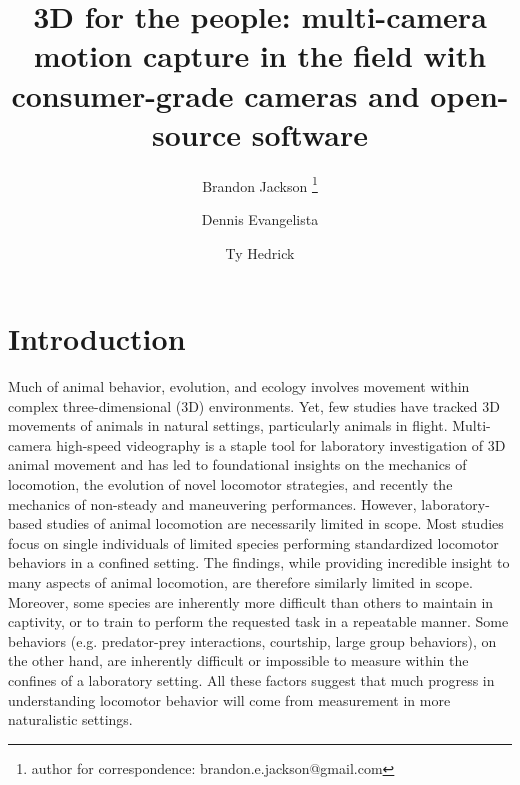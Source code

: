 \documentclass[fleqn,10pt]{wlpeerj}
\title{3D for the people: multi-camera motion capture in the field with consumer-grade cameras and open-source software}
\author[1,2]{Brandon Jackson \thanks{author for correspondence: brandon.e.jackson@gmail.com}}
\author[2]{Dennis Evangelista}
\author[2]{Ty Hedrick}
\affil[1]{Longwood College, Charlottesville, VA}
\affil[2]{University of North Carolina at Chapel Hill, NC 27599-3280, USA}
\begin{document}
\newcommand{\ty}[1]{{\color{blue} #1}}
\newcommand{\dennis}[1]{{\color{red} #1}} %
\newcommand{\brandon}[1]{{\color{cyan} #1}}

\flushbottom
\maketitle
\thispagestyle{empty}

\modulolinenumbers[5]
\linenumbers

\section*{Introduction}


Much of animal behavior, evolution, and ecology involves movement within complex three-dimensional (3D) environments.  Yet, few studies have tracked 3D movements of animals in natural settings, particularly animals in flight.  Multi-camera high-speed videography is a staple tool for laboratory investigation of 3D animal movement and has led to foundational insights on the mechanics of locomotion, the evolution of novel locomotor strategies, and recently the mechanics of non-steady and maneuvering performances. However, laboratory-based studies of animal locomotion are necessarily limited in scope.  Most studies focus on single individuals of limited species performing standardized locomotor behaviors in a confined setting.  The findings, while providing incredible insight to many aspects of animal locomotion, are therefore similarly limited in scope.  Moreover, some species are inherently more difficult than others to maintain in captivity, or to train to perform the requested task in a repeatable manner.  Some behaviors (e.g. predator-prey interactions, courtship, large group behaviors), on the other hand, are inherently difficult or impossible to measure within the confines of a laboratory setting. All these factors suggest that much progress in understanding locomotor behavior will come from measurement in more naturalistic settings. 
\end{document}
